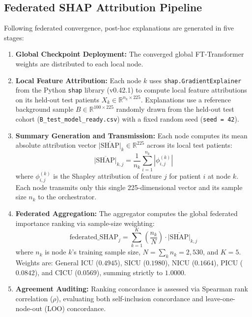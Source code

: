 \documentclass[runningheads]{llncs}
\begin{document}
\subsection{Federated SHAP Attribution Pipeline}
Following federated convergence, post-hoc explanations are generated in five stages:
\begin{enumerate}
\item \textbf{Global Checkpoint Deployment:} The converged global FT-Transformer weights are distributed to each local node.
\item \textbf{Local Feature Attribution:} Each node $k$ uses \texttt{shap.GradientExplainer} from the Python \texttt{shap} library (v0.42.1) to compute local feature attributions on its held-out test patients $X_k \in \mathbb{R}^{n_k \times 225}$. Explanations use a reference background sample $B \in \mathbb{R}^{100 \times 225}$ randomly drawn from the held-out test cohort (\texttt{B\_test\_model\_ready.csv}) with a fixed random seed (\texttt{seed = 42}).
\item \textbf{Summary Generation and Transmission:} Each node computes its mean absolute attribution vector $\overline{|\text{SHAP}|}_k \in \mathbb{R}^{225}$ across its local test patients:
\begin{equation}
\overline{|\text{SHAP}|}_{k,j} = \frac{1}{n_k} \sum_{i=1}^{n_k} |\phi_{i,j}^{(k)}|
\end{equation}
where $\phi_{i,j}^{(k)}$ is the Shapley attribution of feature $j$ for patient $i$ at node $k$. Each node transmits only this single 225-dimensional vector and its sample size $n_k$ to the orchestrator.
\item \textbf{Federated Aggregation:} The aggregator computes the global federated importance ranking via sample-size weighting:
\begin{equation}
\text{federated\_SHAP}_j = \sum_{k=1}^{K} \left(\frac{n_k}{N}\right) \cdot \overline{|\text{SHAP}|}_{k,j}
\label{eq:agg}
\end{equation}
where $n_k$ is node $k$'s training sample size, $N = \sum_k n_k = 2{,}530$, and $K = 5$. Weights are: General ICU ($0.4945$), SICU ($0.1980$), NICU ($0.1664$), PICU ($0.0842$), and CICU ($0.0569$), summing strictly to $1.0000$.
\item \textbf{Agreement Auditing:} Ranking concordance is assessed via Spearman rank correlation ($\rho$), evaluating both self-inclusion concordance and leave-one-node-out (LOO) concordance.
\end{enumerate}
\end{document}
